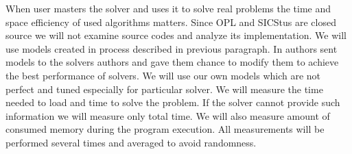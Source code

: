 When user masters the solver and uses it to solve real problems the time and space efficiency of used algorithms matters. Since OPL and SICStus are closed source we will not examine source codes and analyze its implementation. We will use models created in process described in previous paragraph. In \cite{fernandez00} authors sent models to the solvers authors and gave them chance to modify them to achieve the best performance of solvers. We will use our own models which are not perfect and tuned especially for particular solver. We will measure the time needed to load and time to solve the problem. If the solver cannot provide such information we will measure only total time. We will also measure amount of consumed memory during the program execution. All measurements will be performed several times and averaged to avoid randomness.
